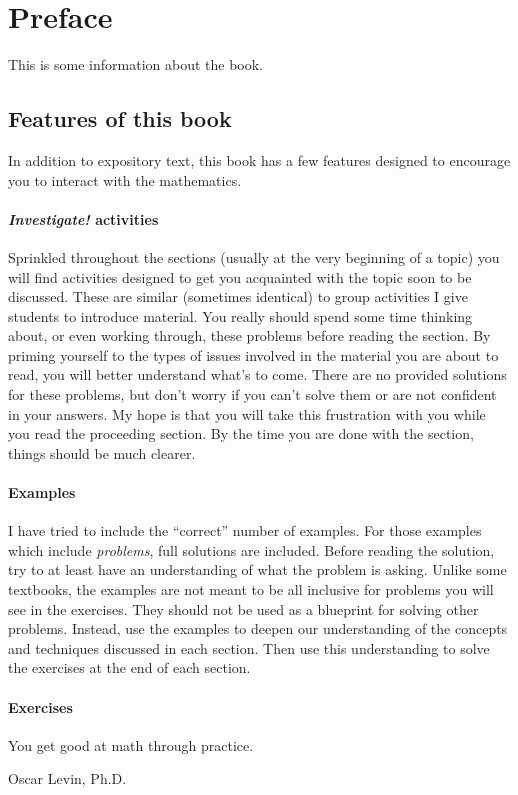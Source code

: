 \chapter{Preface}

This is some information about the book.

\section*{Features of this book}

In addition to expository text, this book has a few features designed to encourage you to interact with the mathematics.

\subsubsection*{\textit{Investigate!} activities}  Sprinkled throughout the sections (usually at the very beginning of a topic) you will find activities designed to get you acquainted with the topic soon to be discussed.  These are similar (sometimes identical) to group activities I give students to introduce material.  You really should spend some time thinking about, or even working through, these problems before reading the section.  By priming yourself to the types of issues involved in the material you are about to read, you will better understand what's to come.  There are no provided solutions for these problems, but don't worry if you can't solve them or are not confident in your answers.  My hope is that you will take this frustration with you while you read the proceeding section.  By the time you are done with the section, things should be much clearer.

\subsubsection*{Examples}

I have tried to include the ``correct'' number of examples.  For those examples which include \emph{problems}, full solutions are included. Before reading the solution, try to at least have an understanding of what the problem is asking.  Unlike some textbooks, the examples are not meant to be all inclusive for problems you will see in the exercises.  They should not be used as a blueprint for solving other problems.  Instead, use the examples to deepen our understanding of the concepts and techniques discussed in each section.  Then use this understanding to solve the exercises at the end of each section.

\subsubsection*{Exercises}

You get good at math through practice.  


\begin{flushright}
Oscar Levin, Ph.D.
\end{flushright}
\newpage